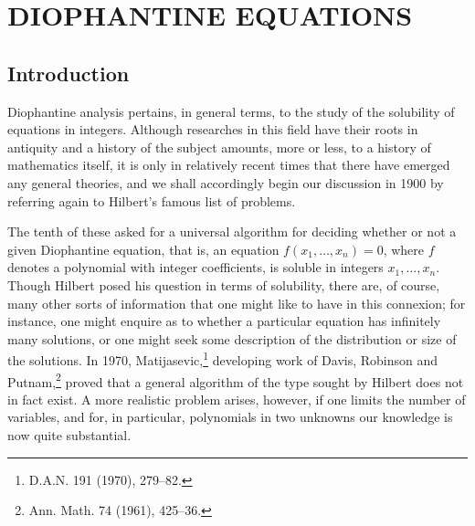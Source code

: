 
\chapter{DIOPHANTINE EQUATIONS}\label{ch:4}

\section{Introduction}\label{sec:ch4_1}

Diophantine analysis pertains, in general terms, to the study of the solubility of equations in integers. Although researches in this field have their roots in antiquity and a history of the subject amounts, more or less, to a history of mathematics itself, it is only in relatively recent times that there have emerged any general theories, and we shall accordingly begin our discussion in 1900 by referring again to Hilbert's famous list of problems.

The tenth of these asked for a universal algorithm for deciding whether or not a given Diophantine equation, that is, an equation $f(x_1, \dots, x_n) = 0$, where $f$ denotes a polynomial with integer coefficients, is soluble in integers $x_1, \dots, x_n$. Though Hilbert posed his question in terms of solubility, there are, of course, many other sorts of information that one might like to have in this connexion; for instance, one might enquire as to whether a particular equation has infinitely many solutions, or one might seek some description of the distribution or size of the solutions. In 1970, Matijasevic,\footnote{D.A.N. 191 (1970), 279--82.} developing work of Davis, Robinson and Putnam,\footnote{Ann. Math. 74 (1961), 425--36.} proved that a general algorithm of the type sought by Hilbert does not in fact exist. A more realistic problem arises, however, if one limits the number of variables, and for, in particular, polynomials in two unknowns our knowledge is now quite substantial.

